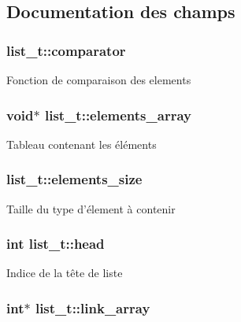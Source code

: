 \subsection{\-Documentation des champs}
\hypertarget{structlist__t_a37b34fd423a00ddc7ad662c29fbd177e}{
\subsubsection[{comparator}]{ {\bf list\-\_\-t\-::comparator}}}\label{structlist__t_a37b34fd423a00ddc7ad662c29fbd177e}
\-Fonction de comparaison des elements \hypertarget{structlist__t_a799d9396ef609198dc4dff6456a99bb9}{
\subsubsection[{elements\-\_\-array}]{\setlength{\rightskip}{0pt plus 5cm}void$\ast$ {\bf list\-\_\-t\-::elements\-\_\-array}}}\label{structlist__t_a799d9396ef609198dc4dff6456a99bb9}
\-Tableau contenant les éléments \hypertarget{structlist__t_a467978ad64ca202b560905f80a93bf8a}{
\subsubsection[{elements\-\_\-size}]{ {\bf list\-\_\-t\-::elements\-\_\-size}}}\label{structlist__t_a467978ad64ca202b560905f80a93bf8a}
\-Taille du type d'élement à contenir \hypertarget{structlist__t_a0c48694d3aca4dbf169881b9df794cb6}{
\subsubsection[{head}]{\setlength{\rightskip}{0pt plus 5cm}int {\bf list\-\_\-t\-::head}}}\label{structlist__t_a0c48694d3aca4dbf169881b9df794cb6}
\-Indice de la tête de liste \hypertarget{structlist__t_ae66525dffaeeeda67bd46d8c90fa2863}{
\subsubsection[{link\-\_\-array}]{\setlength{\rightskip}{0pt plus 5cm}int$\ast$ {\bf list\-\_\-t\-::link\-\_\-array}}}\label{structlist__t_ae66525dffaeeeda67bd46d8c90fa2863}
